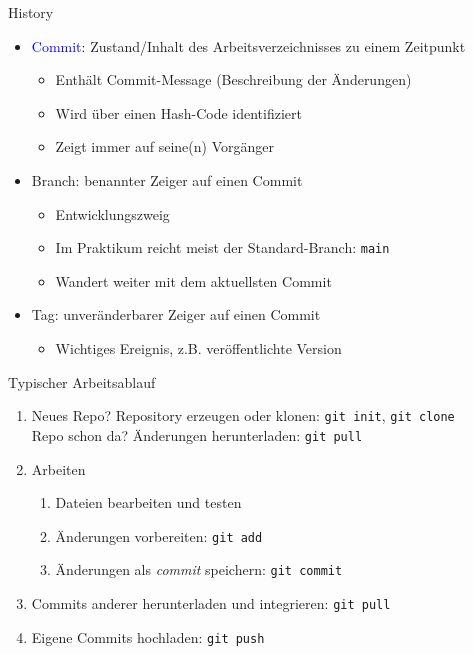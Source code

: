 \begin{frame}{History}
  \vspace{1em}
  \begin{itemize}
    \item<1-> \textcolor{blue}{Commit}: Zustand/Inhalt des Arbeitsverzeichnisses zu einem Zeitpunkt
      \begin{itemize}
        \item Enthält Commit-Message (Beschreibung der Änderungen)
        \item Wird über einen Hash-Code identifiziert
        \item Zeigt immer auf seine(n) Vorgänger
      \end{itemize}
    \item<2-> \textcolor{vertexDarkRed}{Branch}: benannter Zeiger auf einen Commit
      \begin{itemize}
        \item Entwicklungszweig
		\item Im Praktikum reicht meist der Standard-Branch: \texttt{main}
		    \item Wandert weiter mit dem aktuellsten Commit
      \end{itemize}
    \item<4-> \textcolor{green!60!black}{Tag}: unveränderbarer Zeiger auf einen Commit
      \begin{itemize}
        \item Wichtiges Ereignis, z.B. veröffentlichte Version
      \end{itemize}
  \end{itemize}
\end{frame}

\begin{frame}{Typischer Arbeitsablauf}
  \begin{enumerate}
    \item Neues Repo? Repository erzeugen oder klonen: \hfill\texttt{git init}, \texttt{git clone} \\
      Repo schon da? Änderungen herunterladen: \hfill\texttt{git pull}
    \item Arbeiten
      \begin{enumerate}
        \item Dateien bearbeiten und testen
        \item Änderungen vorbereiten: \hfill\texttt{git add}
        \item Änderungen als \emph{commit} speichern: \hfill\texttt{git commit}
      \end{enumerate}
    \item Commits anderer herunterladen und integrieren: \hfill\texttt{git pull}
    \item Eigene Commits hochladen: \hfill\texttt{git push}
  \end{enumerate}
\end{frame}

